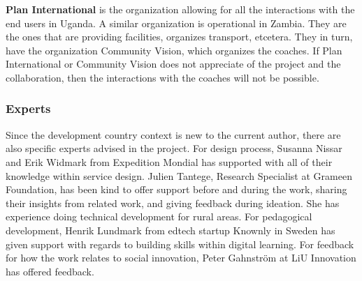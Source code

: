 \textbf{Plan International} is the organization allowing for all the interactions with the end users in Uganda. A similar organization is operational in Zambia. They are the ones that are providing facilities, organizes transport, etcetera. They in turn, have the organization Community Vision, which organizes the coaches. If Plan International or Community Vision does not appreciate of the project and the collaboration, then the interactions with the coaches will not be possible.


\subsubsection{Experts}
Since the development country context is new to the current author, there are also specific experts advised in the project. For design process, Susanna Nissar and Erik Widmark from Expedition Mondial has supported with all of their knowledge within service design. Julien Tantege, Research Specialist at Grameen Foundation, has been kind to offer support before and during the work, sharing their insights from related work, and giving feedback during ideation. She has experience doing technical development for rural areas. For pedagogical development, Henrik Lundmark from edtech startup Knownly in Sweden has given support with regards to building skills within digital learning. For feedback for how the work relates to social innovation, Peter Gahnström at LiU Innovation has offered feedback.
